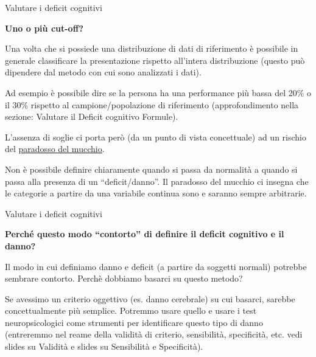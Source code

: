 \documentclass[
  ignorenonframetext,
]{beamer}
\begin{document}
\begin{frame}{Valutare i deficit cognitivi}
\label{valutare-i-deficit-cognitivi-25}
\begin{center}
  \textbf{Uno o più cut-off?}
\end{center}

\small

Una volta che si possiede una distribuzione di dati di riferimento è
possibile in generale classificare la presentazione rispetto all'intera
distribuzione (questo può dipendere dal metodo con cui sono analizzati i
dati).

Ad esempio è possibile dire se la persona ha una performance più bassa
del 20\% o il 30\% rispetto al campione/popolazione di riferimento
(approfondimento nella sezione: Valutare il Deficit cognitivo Formule).

L'assenza di soglie ci porta però (da un punto di vista concettuale) ad
un rischio del
\href{https://it.wikipedia.org/wiki/Paradosso_del_sorite}{\ul{paradosso
del mucchio}}.

Non è possibile definire chiaramente quando si passa da normalità a
quando si passa alla presenza di un ``deficit/danno''. Il paradosso del
mucchio ci insegna che le categorie a partire da una variabile continua
sono e saranno sempre arbitrarie.
\end{frame}

\begin{frame}{Valutare i deficit cognitivi}
\label{valutare-i-deficit-cognitivi-26}
\begin{center}
  \textbf{Perché questo modo “contorto” di definire il deficit cognitivo e il danno?}
\end{center}
\vspace{2em}

Il modo in cui definiamo danno e deficit (a partire da soggetti normali)
potrebbe sembrare contorto. Perchè dobbiamo basarci su questo metodo?

Se avessimo un criterio oggettivo (es. danno cerebrale) su cui basarci,
sarebbe concettualmente più semplice. Potremmo usare quello e usare i
test neuropsicologici come strumenti per identificare questo tipo di
danno (entreremmo nel reame della validità di criterio, sensibilità,
specificità, etc. vedi slides su Validità e slides su Sensibilità e
Specificità).
\end{frame}
\end{document}
